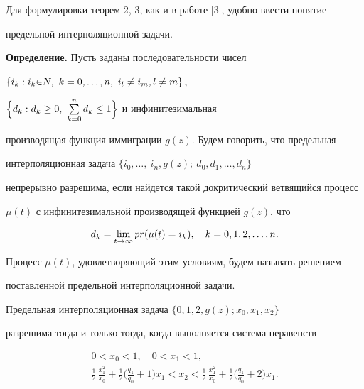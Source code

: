 Для формулировки теорем 2, 3, как и в работе [3], удобно ввести понятие


предельной  интерполяционной задачи.


\medskip





{\bf Определение.}  Пусть заданы последовательности чисел


$\{i_k:i_k{\in} N,\ k=0, \dotsc,n,\ i_l\ne i_m,\linebreak l\ne m\}$,


$\Big\{d_k:d_k\geq 0,\ \sum \limits_ {k=0}^{n}d_k\leq 1\Big\}$ и инфинитезимальная


производящая функция иммиграции $g(z)$. Будем говорить, что предельная


интерполяционная задача $\{i_0, \dotsc ,\ i_n, g(z);\ d_0, d_1,\dotsc,d_n\}$


непрерывно разрешима, если найдется такой докритический ветвящийся процесс


$\mu (t)$ с инфинитезимальной производящей функцией $g(z)$, что


$$


d_k=\Li {t\to \infty }pr(\mu (t)=i_k),\quad k=0, 1, 2, \dotsc ,n.


$$


Процесс $\mu (t)$, удовлетворяющий этим условиям, будем называть решением


поставленной предельной интерполяционной задачи.





\begin{thm}


Предельная интерполяционная задача $\{0, 1, 2, g(z);x_0, x_1, x_2\} $


разрешима тогда и только тогда, когда выполняется система неравенств


\begin{gather*}


0<x_0<1,\quad 0<x_1<1,\\


%


\frac 1{2}\, \frac {x_1^2}{x_0}+\frac 1{2}\bigg(


\frac {q_1}{q_0}+1\bigg)x_1<x_2<


\frac 1{2}\, \frac {x_1^2}{x_0}+\frac 1{2}


\bigg(\frac {q_1}{q_0}+2\bigg)x_1.


\end{gather*}


\end{thm}





